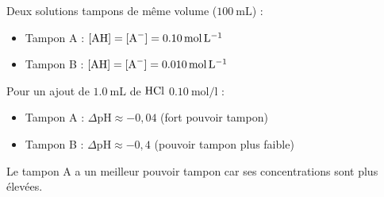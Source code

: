 \begin{exemple}
Deux solutions tampons de même volume ($\SI{100}{\mL}$) :
\begin{itemize}
    \item Tampon A : $[\ce{AH}] = [\ce{A-}] = \SI{0,10}{\mol\per\litre}$
    \item Tampon B : $[\ce{AH}] = [\ce{A-}] = \SI{0,010}{\mol\per\litre}$
\end{itemize}
Pour un ajout de $\SI{1,0}{\mL}$ de $\ce{HCl}$ $\SI{0,10}{\mol\per\litre}$ :
\begin{itemize}
    \item Tampon A : $\Delta\mathrm{pH} \approx -0,04$ (fort pouvoir tampon)
    \item Tampon B : $\Delta\mathrm{pH} \approx -0,4$ (pouvoir tampon plus faible)
\end{itemize}
Le tampon A a un meilleur pouvoir tampon car ses concentrations sont plus élevées.
\end{exemple}